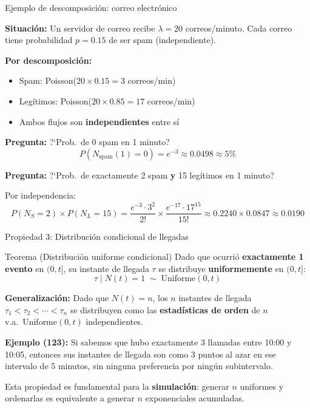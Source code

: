 \documentclass[aspectratio=1610, 9pt]{beamer}
\begin{document}
\begin{frame}{Ejemplo de descomposici\'{o}n: correo electr\'{o}nico}

\textbf{Situaci\'{o}n:} Un servidor de correo recibe $\lambda = 20$ correos/minuto. Cada correo tiene probabilidad $p = 0.15$ de ser spam (independiente).

\vspace{0.3cm}
\textbf{Por descomposici\'{o}n:}
\begin{itemize}
    \item Spam: Poisson($20 \times 0.15 = 3$ correos/min)
    \item Leg\'{i}timos: Poisson($20 \times 0.85 = 17$ correos/min)
    \item Ambos flujos son \textbf{independientes} entre s\'{i}
\end{itemize}

\vspace{0.3cm}
\textbf{Pregunta:} ?`Prob.\ de 0 spam en 1 minuto?
\[
P(N_{\text{spam}}(1) = 0) = e^{-3} \approx 0.0498 \approx 5\%
\]

\textbf{Pregunta:} ?`Prob.\ de exactamente 2 spam \textbf{y} 15 leg\'{i}timos en 1 minuto?

Por independencia:
\[
P(N_S=2) \times P(N_L=15) = \frac{e^{-3}\cdot 3^2}{2!} \times \frac{e^{-17}\cdot 17^{15}}{15!} \approx 0.2240 \times 0.0847 \approx 0.0190
\]
\end{frame}

\begin{frame}{Propiedad 3: Distribuci\'{o}n condicional de llegadas}

\begin{block}{Teorema (Distribuci\'{o}n uniforme condicional)}
Dado que ocurri\'{o} \textbf{exactamente 1 evento} en $(0,t]$, su instante de llegada $\tau$ se distribuye \textbf{uniformemente} en $(0,t]$:
\[
\tau \mid N(t)=1 \;\sim\; \text{Uniforme}(0,t)
\]
\end{block}

\vspace{0.2cm}
\textbf{Generalizaci\'{o}n:} Dado que $N(t)=n$, los $n$ instantes de llegada $\tau_1 < \tau_2 < \cdots < \tau_n$ se distribuyen como las \textbf{estad\'{i}sticas de orden} de $n$ v.a.\ Uniforme$(0,t)$ independientes.

\vspace{0.3cm}
\textbf{Ejemplo (123):} Si sabemos que hubo exactamente 3 llamadas entre 10:00 y 10:05, entonces sus instantes de llegada son como 3 puntos al azar en ese intervalo de 5 minutos, sin ninguna preferencia por ning\'{u}n subintervalo.

\vspace{0.2cm}
Esta propiedad es fundamental para la \textbf{simulaci\'{o}n}: generar $n$ uniformes y ordenarlas es equivalente a generar $n$ exponenciales acumuladas.
\end{frame}
\end{document}
